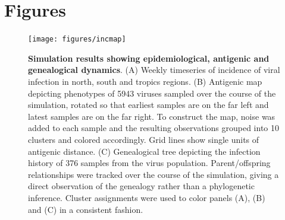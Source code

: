 \documentclass[11pt,oneside,letterpaper]{article}
\begin{document}


\pagebreak

\section*{Figures}

\begin{figure}[H]
	\centering
	\texttt{[image: figures/incmap]}
	\caption{\textbf{Simulation results showing epidemiological, antigenic and genealogical dynamics}. (A) Weekly timeseries of incidence of viral infection in north, south and tropics regions. (B) Antigenic map depicting phenotypes of 5943 viruses sampled over the course of the simulation, rotated so that earliest samples are on the far left and latest samples are on the far right.  To construct the map, noise was added to each sample and the resulting observations grouped into 10 clusters and colored accordingly.  Grid lines show single units of antigenic distance. (C) Genealogical tree depicting the infection history of 376 samples from the virus population.  Parent/offspring relationships were tracked over the course of the simulation, giving a direct observation of the genealogy rather than a phylogenetic inference. Cluster assignments were used to color panels (A), (B) and (C) in a consistent fashion.}
	\label{incmap}
\end{figure}

\pagebreak
\end{document}

